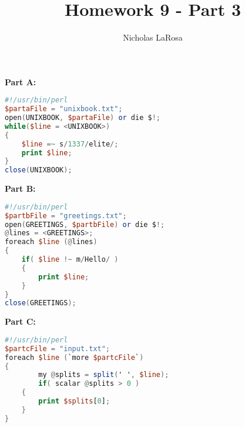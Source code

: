 \documentclass{article}
\begin{document}
\title{Homework 9 - Part 3}
\author{Nicholas LaRosa}

\maketitle

\large{\textbf{Part A:}}
\begin{lstlisting}[language=awk]
#!/usr/bin/perl
$partaFile = "unixbook.txt";
open(UNIXBOOK, $partaFile) or die $!;
while($line = <UNIXBOOK>)
{
	$line =~ s/1337/elite/;
	print $line;
}
close(UNIXBOOK);
\end{lstlisting}

\large{\textbf{Part B:}}
\begin{lstlisting}[language=awk]
#!/usr/bin/perl
$partbFile = "greetings.txt";
open(GREETINGS, $partbFile) or die $!;
@lines = <GREETINGS>;
foreach $line (@lines)
{
	if( $line !~ m/Hello/ )
	{
		print $line;
	}
}
close(GREETINGS);
\end{lstlisting}

\large{\textbf{Part C:}}
\begin{lstlisting}[language=awk]
#!/usr/bin/perl
$partcFile = "input.txt";
foreach $line (`more $partcFile`)
{
        my @splits = split(' ', $line);
        if( scalar @splits > 0 )
	{
		print $splits[0];
	}
}
\end{lstlisting}
\end{document}
